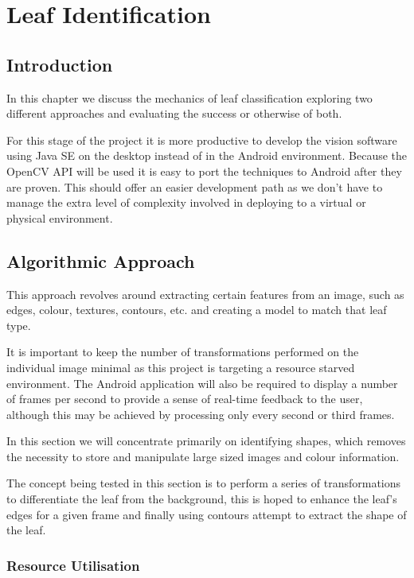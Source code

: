 \chapter{Leaf Identification}

\section{Introduction}
In this chapter we discuss the mechanics of leaf classification exploring two different approaches and evaluating the success or otherwise of both.

For this stage of the project it is more productive to develop the vision software using Java SE on the desktop instead of in the Android environment. Because the OpenCV API will be used it is easy to port the techniques to Android after they are proven. This should offer an easier development path as we don't have to manage the extra level of complexity involved in deploying to a virtual or physical environment. 


\section{Algorithmic Approach}

This approach revolves around extracting certain features from an image, such as edges, colour, textures, contours, etc. and creating a model to match that leaf type.

It is important to keep the number of transformations performed on the individual image minimal as this project is targeting a resource starved environment. The Android application will also be required to display a number of frames per second to provide a sense of real-time feedback to the user, although this may be achieved by processing only every second or third frames.

In this section we will concentrate primarily on identifying shapes, which removes the necessity to store and manipulate large sized images and colour information. 

The concept being tested in this section is to perform a series of transformations to differentiate the leaf from the background, this is hoped to enhance the leaf’s edges for a given frame and finally using contours attempt to extract the shape of the leaf. 

\subsection{Resource Utilisation}

